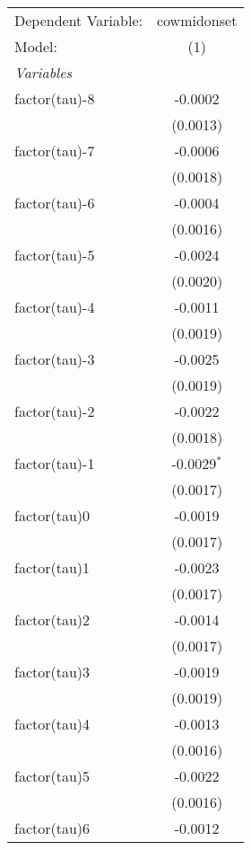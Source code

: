 \begingroup
\centering
\begin{tabular}{lc}
   \tabularnewline \midrule \midrule
   Dependent Variable: & cowmidonset\\  
   Model:              & (1)\\  
   \midrule
   \emph{Variables}\\
   factor(tau)-8       & -0.0002\\   
                       & (0.0013)\\   
   factor(tau)-7       & -0.0006\\   
                       & (0.0018)\\   
   factor(tau)-6       & -0.0004\\   
                       & (0.0016)\\   
   factor(tau)-5       & -0.0024\\   
                       & (0.0020)\\   
   factor(tau)-4       & -0.0011\\   
                       & (0.0019)\\   
   factor(tau)-3       & -0.0025\\   
                       & (0.0019)\\   
   factor(tau)-2       & -0.0022\\   
                       & (0.0018)\\   
   factor(tau)-1       & -0.0029$^{*}$\\   
                       & (0.0017)\\   
   factor(tau)0        & -0.0019\\   
                       & (0.0017)\\   
   factor(tau)1        & -0.0023\\   
                       & (0.0017)\\   
   factor(tau)2        & -0.0014\\   
                       & (0.0017)\\   
   factor(tau)3        & -0.0019\\   
                       & (0.0019)\\   
   factor(tau)4        & -0.0013\\   
                       & (0.0016)\\   
   factor(tau)5        & -0.0022\\   
                       & (0.0016)\\   
   factor(tau)6        & -0.0012\\   

\end{tabular}
